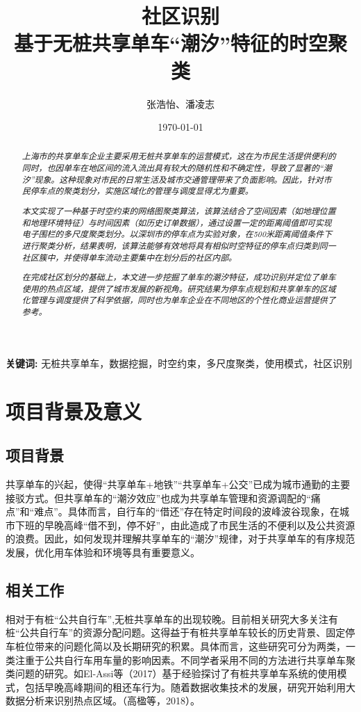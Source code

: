 \documentclass[12pt,a4paper,oneside]{ctexart}
\title{\textbf{社区识别\\基于无桩共享单车“潮汐”特征的时空聚类}}
\author{张浩怡、潘凌志}
\date{\today}
\newcommand{\keywords}[1]{\par\noindent\textbf{关键词:} #1}
\begin{document}
\maketitle
\begin{abstract}
\textit{上海市的共享单车企业主要采用无桩共享单车的运营模式，这在为市民生活提供便利的同时，也因单车在地区间的流入流出具有较大的随机性和不确定性，导致了显著的“潮汐”现象。这种现象对市民的日常生活及城市交通管理带来了负面影响。因此，针对市民停车点的聚类划分，实施区域化的管理与调度显得尤为重要。}

\textit{本文实现了一种基于时空约束的网络图聚类算法，该算法结合了空间因素（如地理位置和地理环境特征）与时间因素（如历史订单数据），通过设置一定的距离阈值即可实现电子围栏的多尺度聚类划分。以深圳市的停车点为实验对象，在500米距离阈值条件下进行聚类分析，结果表明，该算法能够有效地将具有相似时空特征的停车点归类到同一社区簇中，并使得单车流动主要集中在划分后的社区内部。}

\textit{在完成社区划分的基础上，本文进一步挖掘了单车的潮汐特征，成功识别并定位了单车使用的热点区域，提供了城市发展的新视角。研究结果为停车点规划和共享单车的区域化管理与调度提供了科学依据，同时也为单车企业在不同地区的个性化商业运营提供了参考。}
\end{abstract}

\keywords{无桩共享单车，数据挖掘，时空约束，多尺度聚类，使用模式，社区识别}

\section{项目背景及意义}
\subsection{项目背景}

共享单车的兴起，使得“共享单车+地铁”“共享单车+公交”已成为城市通勤的主要接驳方式。但共享单车的“潮汐效应”也成为共享单车管理和资源调配的“痛点”和“难点”\cite{ChatGPT2024}。具体而言，自行车的“借还”存在特定时间段的波峰波谷现象，在城市下班的早晚高峰“借不到，停不好”，由此造成了市民生活的不便利以及公共资源的浪费。因此，如何发现并理解共享单车的“潮汐”规律，对于共享单车的有序规范发展，优化用车体验和环境等具有重要意义。

\subsection{相关工作}

相对于有桩“公共自行车”,无桩共享单车的出现较晚\cite{高楹2018北京市摩拜}。目前相关研究大多关注有桩“公共自行车”的资源分配问题。这得益于有桩共享单车较长的历史背景、固定停车桩位带来的问题化简以及长期研究的积累。具体而言，这些研究可分为两类，一类注重于公共自行车用车量的影响因素。不同学者采用不同的方法进行共享单车聚类问题的研究。如El-Assi等（2017）基于经验探讨了有桩共享单车系统的使用模式，包括早晚高峰期间的租还车行为\cite{el2017}。随着数据收集技术的发展，研究开始利用大数据分析来识别热点区域。（高楹等，2018）\cite{高楹2018北京市摩拜}。
\end{document}
